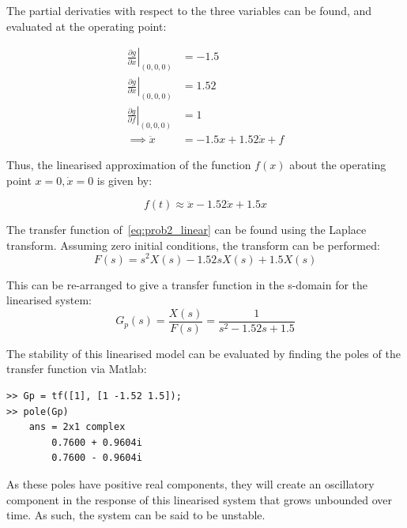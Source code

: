 \documentclass[11pt,a4paper]{article}
\begin{document}
The partial derivaties with respect to the three variables can be found, and evaluated at the operating point:

\begin{align*}
    \left.\frac{\partial g}{\partial x}\right|_{(0,0,0)} &= -1.5 \\
    \left.\frac{\partial g}{\partial \dot{x}}\right|_{(0,0,0)} &= 1.52 \\
    \left.\frac{\partial g}{\partial f}\right|_{(0,0,0)} &= 1 \\
    \implies \ddot{x} &= -1.5x + 1.52\dot{x} + f
\end{align*}

Thus, the linearised approximation of the function $f(x)$ about the operating point $x = 0, \dot{x} = 0$ is given by:

\begin{equation}
    f(t) \approx \ddot{x} - 1.52\dot{x} + 1.5{x}
    \label{eq:prob2_linear}
\end{equation}

The transfer function of~\eqref{eq:prob2_linear} can be found using the Laplace transform. Assuming zero initial conditions, the transform can be performed:
$$
F(s) = s^2X(s) - 1.52sX(s) + 1.5X(s)
$$

This can be re-arranged to give a transfer function in the s-domain for the linearised system: 
\begin{equation}
    G_p(s) = \frac{X(s)}{F(s)} = \frac{1}{s^2 - 1.52s + 1.5}
    \label{eq:prob2_plant_tf}
\end{equation}

The stability of this linearised model can be evaluated by finding the poles of the transfer function via Matlab:

\par\noindent\begin{minipage}{\linewidth}
\begin{lstlisting}[style=outputstyle]
>> Gp = tf([1], [1 -1.52 1.5]);
>> pole(Gp)
    ans = 2x1 complex
        0.7600 + 0.9604i
        0.7600 - 0.9604i
\end{lstlisting}
\end{minipage}\par
As these poles have positive real components, they will create an oscillatory component in the response of this linearised system that grows unbounded over time. As such, the system can be said to be unstable. 
\end{document}

